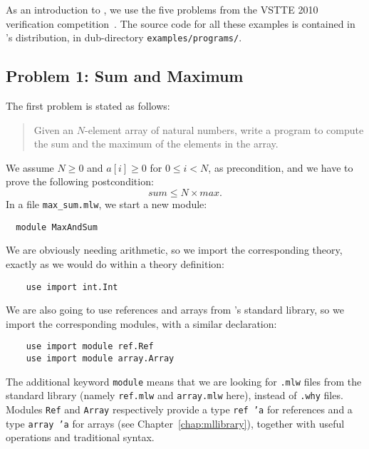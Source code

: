 \medskip
As an introduction to \whyml, we use the five problems from the VSTTE
2010 verification competition~\cite{vstte10comp}.
The source code for all these examples is contained in \why's
distribution, in dub-directory \texttt{examples/programs/}.

\subsection{Problem 1: Sum and Maximum}

The first problem is stated as follows:
\begin{quote}
  Given an $N$-element array of natural numbers,
  write a program to compute the sum and the maximum of the
  elements in the array.
\end{quote}
We  assume $N \ge 0$ and $a[i] \ge 0$ for $0 \le i < N$, as precondition,
and we have to prove the following postcondition:
\begin{displaymath}
  sum \le N \times max.
\end{displaymath}
In a file \verb|max_sum.mlw|, we start a new module:
\begin{verbatim}
  module MaxAndSum
\end{verbatim}
We are obviously needing arithmetic, so we import the corresponding
theory, exactly as we would do within a theory definition:
\begin{verbatim}
    use import int.Int
\end{verbatim}
We are also going to use references and arrays from \whyml's standard
library, so we import the corresponding modules, with a similar
declaration:
\begin{verbatim}
    use import module ref.Ref
    use import module array.Array
\end{verbatim}
The additional keyword \texttt{module} means that we are looking for
\texttt{.mlw} files from the standard library (namely \texttt{ref.mlw}
and \texttt{array.mlw} here), instead of \texttt{.why} files.
Modules \texttt{Ref} and \texttt{Array} respectively provide a type
\texttt{ref 'a} for references and a type \texttt{array 'a} for
arrays (see Chapter~\ref{chap:mllibrary}), together with useful
operations and traditional syntax.

